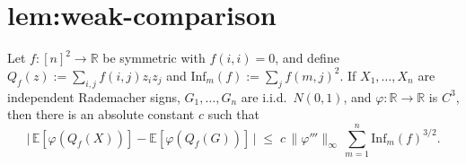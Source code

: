 \chapter{lem:weak-comparison}\label{chap:lem_weak_comparison}
\begin{lemma}
\label{lem:weak-comparison}
Let $f : [n]^2 \to \mathbb{R}$ be symmetric with $f(i,i) = 0$, and define
$Q_f(z) := \sum_{i,j} f(i,j) z_i z_j$ and
$\mathrm{Inf}_m(f) := \sum_j f(m,j)^2$.
If $X_1, \dots, X_n$ are independent Rademacher signs,
$G_1, \dots, G_n$ are i.i.d.\ $N(0,1)$, and $\varphi : \mathbb{R} \to
\mathbb{R}$ is $C^3$, then there is an absolute constant $c$ such that
\[
  \bigl|\,\mathbb{E}[\varphi(Q_f(X))] - \mathbb{E}[\varphi(Q_f(G))]\,\bigr|
  \;\le\; c\,\|\varphi'''\|_\infty\,\sum_{m=1}^n \mathrm{Inf}_m(f)^{3/2}.
\]
\end{lemma}
